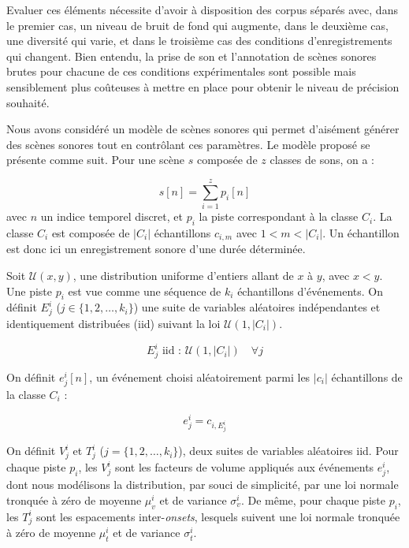 Evaluer ces éléments nécessite d'avoir à disposition des corpus séparés avec, dans le premier cas, un niveau de bruit de fond qui augmente, dans le deuxième cas, une diversité qui varie, et dans le troisième cas des conditions d'enregistrements qui changent. Bien entendu, la prise de son et l'annotation de scènes sonores brutes pour chacune de ces conditions expérimentales sont possible mais sensiblement plus coûteuses à mettre en place pour obtenir le niveau de précision souhaité.


Nous avons considéré un modèle de scènes sonores qui permet d'aisément générer des scènes sonores tout en contrôlant ces paramètres. Le modèle proposé se présente comme suit. Pour une scène $s$ composée de $z$ classes de sons, on a :

\begin{equation}
  s[n]=\sum_{i=1}^{z}p_i[n]
\end{equation}
avec $n$ un indice temporel discret, et $p_i$ la piste correspondant à la classe $C_i$. La classe $C_i$ est composée de $\vert C_i\vert$ échantillons $c_{i,m}$ avec $1<m<\vert C_i\vert$. Un échantillon est donc ici un enregistrement sonore d'une durée déterminée.

Soit $\mathcal{U}(x,y)$, une distribution uniforme d'entiers allant de $x$ à $y$, avec $x<y$. Une piste $p_i$ est vue comme une séquence de $k_i$ échantillons d'événements. On définit $E_j^i$ ($j \in \lbrace 1,2,\ldots,k_i\rbrace$) une suite de variables aléatoires indépendantes et identiquement distribuées (iid) suivant la loi $\mathcal{U}(1,\vert C_i \vert)$.

\begin{equation}
  E_j^i \textrm{ iid : } \mathcal{U}(1,\vert C_i \vert) \quad \forall j
\end{equation}

On définit $e_j^i[n]$, un événement choisi aléatoirement parmi les $\vert c_i\vert$ échantillons de la classe $C_i$ :

\begin{equation}
  e_j^i=c_{i,E_j^i}
\end{equation}

On définit $V^i_j$ et $T^i_j$ ($j=\lbrace 1,2,\ldots,k_i\rbrace$), deux suites de variables aléatoires iid. Pour chaque piste $p_i$, les $V^i_j$ sont les facteurs de volume appliqués aux événements $e_j^i$, dont nous modélisons la distribution, par souci de simplicité, par une loi normale tronquée à zéro de moyenne $\mu_v^i$ et de variance $\sigma_v^i$. De même, pour chaque piste $p_i$, les $T_j^i$ sont les espacements inter-\emph{onsets}, lesquels suivent une loi normale tronquée à zéro de moyenne $\mu_t^i$ et de variance $\sigma_t^i$.

